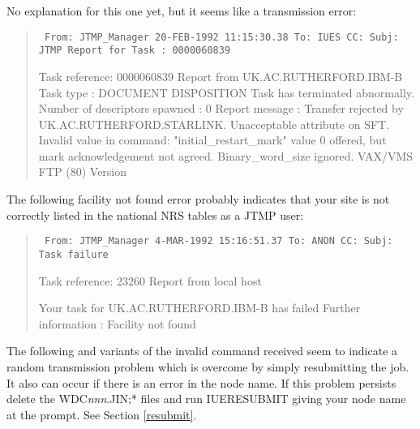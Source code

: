 \rm
No explanation for this one yet, but it seems like a transmission error:

\begin{quote}
{\small
\tt
From:	JTMP\_Manager 20-FEB-1992 11:15:30.38
\newline
To:	IUES        
\newline
CC:	
\newline
Subj:	JTMP Report for Task : 0000060839

Task reference: 0000060839
\newline
Report from UK.AC.RUTHERFORD.IBM-B
\newline
Task type : DOCUMENT DISPOSITION
\newline
Task has terminated abnormally.
\newline
Number of descriptors spawned : 0
\newline
Report message : 
\newline
Transfer rejected by UK.AC.RUTHERFORD.STARLINK. Unacceptable attribute on SFT. 
\newline
Invalid value in command:  "initial\_restart\_mark" value 0 offered, but mark 
\newline
acknowledgement not agreed. Binary\_word\_size ignored. VAX/VMS FTP (80) Version 
}
\end{quote}

\rm
The following
facility not found error probably indicates that your site is not correctly
listed in the national NRS tables as a JTMP user:

\begin{quote}
{\small
\tt
From:	JTMP\_Manager  4-MAR-1992 15:16:51.37
\newline
To:	ANON
\newline
CC:	
\newline
Subj:	Task failure

Task reference: 23260
\newline
Report from local host

Your task for UK.AC.RUTHERFORD.IBM-B has failed
\newline
Further information :
\newline
Facility not found
}
\end{quote}

\rm
The following 
and variants of the invalid command received seem to indicate a random
transmission problem which is overcome by simply resubmitting the job. It also
can occur if there is an error in the node name. If this problem persists delete
the WDC{\it nnn}.JIN;* files and run IUERESUBMIT giving your node name at the prompt.
See Section \ref{resubmit}.

